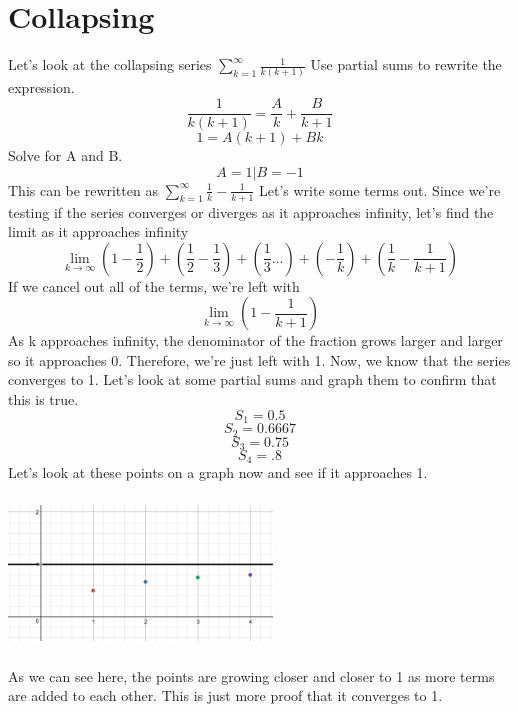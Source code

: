 \documentclass[a4paper,openright, 14pt]{article}
\begin{document}
\section*{Collapsing}
Let's look at the collapsing series $\sum\limits_{k=1}^{\infty} \frac{1}{k(k+1)}$
Use partial sums to rewrite the expression.
$$\frac{1}{k(k+1)}=\frac{A}{k}+\frac{B}{k+1}$$
$$1=A(k+1)+Bk$$
Solve for A and B.
$$A=1|B=-1$$
This can be rewritten as $\sum\limits_{k=1}^{\infty} \frac{1}{k}-\frac{1}{k+1}$
Let's write some terms out. Since we're testing if the series converges or diverges as it approaches infinity, let's find the limit as it approaches infinity
$$\lim_{k\to\infty}(1-\frac{1}{2})+(\frac{1}{2}-\frac{1}{3})+(\frac{1}{3}...)+(-\frac{1}{k})+(\frac{1}{k}-\frac{1}{k+1})$$
If we cancel out all of the terms, we're left with
$$\lim_{k\to\infty}(1-\frac{1}{k+1})$$
As k approaches infinity, the denominator of the fraction grows larger and larger so it approaches 0. Therefore, we're just left with 1. Now, we know that the series converges to 1. Let's look at some partial sums and graph them to confirm that this is true.
$$S_1=0.5$$
$$S_2=0.6667$$
$$S_3=0.75$$
$$S_4=.8$$
Let’s look at these points on a graph now and see if it approaches 1.
\begin{center}
    \includegraphics[height=4cm, width= 7cm]{Images/graph4.png}
\end{center}
As we can see here, the points are growing closer and closer to 1 as more terms are added to each other. This is just more proof that it converges to 1.
\end{document}
